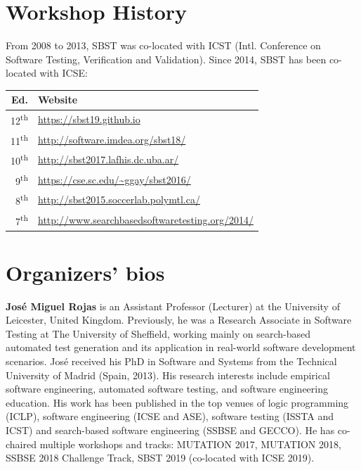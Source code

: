 \documentclass[sigconf,review]{acmart}
\newcommand{\TODO}[1]{\textbf{\textcolor{ScarletRed}{[TODO: #1]}}\xspace}
\newcommand{\TODO}[1]{}
\begin{document}
\section{Workshop History}

From 2008 to 2013, SBST was co-located with ICST (Intl. Conference on
Software Testing, Verification and Validation). Since 2014, SBST has
been co-located with ICSE:%
\begin{table}[h]
\centering
\begin{tabular}{rl}\toprule
Ed. & Website \\\midrule
12\textsuperscript{th} & \url{https://sbst19.github.io} \\
11\textsuperscript{th} & \url{http://software.imdea.org/sbst18/} \\
10\textsuperscript{th} & \url{http://sbst2017.lafhis.dc.uba.ar/} \\
9\textsuperscript{th}  & \url{https://cse.sc.edu/~ggay/sbst2016/} \\
8\textsuperscript{th}  & \url{http://sbst2015.soccerlab.polymtl.ca/} \\
7\textsuperscript{th}  & \url{http://www.searchbasedsoftwaretesting.org/2014/}\\\bottomrule
\end{tabular}
\end{table}


\section{Organizers’ bios}

{\bf Jos\'e Miguel Rojas} is an Assistant Professor (Lecturer) at the
University of Leicester, United Kingdom. Previously, he was a Research
Associate in Software Testing at The University of Sheffield, working
mainly on search-based automated test generation and its application
in real-world software development scenarios. Jos\'e received his PhD
in Software and Systems from the Technical University of Madrid
(Spain, 2013). His research interests include empirical software
engineering, automated software testing, and software engineering
education. His work has been published in the top venues of logic
programming (ICLP), software engineering (ICSE and ASE), software
testing (ISSTA and ICST) and search-based software engineering (SSBSE
and GECCO). He has co-chaired multiple workshops and tracks: MUTATION
2017, MUTATION 2018, SSBSE 2018 Challenge Track, SBST 2019 (co-located
with ICSE 2019).
\end{document}
